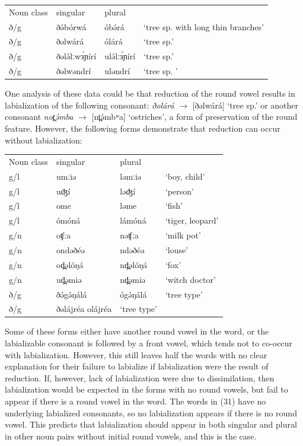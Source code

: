 \ea
\begin{tabular}[t]{llll}
Noun class	&	singular		&	plural\\
ð/g	&	ðə́bórwá		&	óbə́rá		&	‘tree sp. with long thin branches’\\
ð/g	&	ðəlwárá		&	ólárá	&	‘tree sp.’\\
ð/g	&	ðələ́lːwɜ́ɲírí	&	ulə́lːɜ́ɲírí	&	‘tree sp.’\\
ð/g	&	ðəlwəndrí	&	uləndrí	&	‘tree sp. ’\\
\end{tabular}
\z

One analysis of these data could be that reduction of the round vowel results in labialization of the following consonant: \textit{ðolárá} $\rightarrow$ [ðəlwárá] ‘tree sp.’ or another consonant \textit{not̪ə́mba} $\rightarrow$ [nt̪ə́mbʷa] ‘ostriches’, a form of preservation of the round feature. However, the following forms demonstrate that reduction can occur without labialization:

\ea
\begin{tabular}[t]{llll}
Noun class	&	singular		&	plural\\
g/l	&	umːiə	&	ləmːiə	 	&	‘boy, child’\\
g/l	&	uʤí		&	ləʤí		&	‘person’\\
g/l	&	ome		&	ləme			&	‘fish’\\
g/l	&	ómóná	&	lámóná		&	‘tiger, leopard’\\
g/n	&	oʧːa	&	nəʧːa		&	‘milk pot’\\
g/n	&	ondəðéə	&	ndəðéə		&	‘louse’\\
g/n	&	od̪əlóŋá	&	nd̪əlóŋá		&	‘fox’\\
g/n	&	ud̪əmiə	&	nd̪əmiə		&	‘witch doctor’\\
ð/g	&	ðə́gə́ŋálá	&	ógə́ŋálá		&	‘tree type’\\
ð/g	&	ðəlájréa	olájréa		&	‘tree type’\\
\end{tabular}
\z

Some of these forms either have another round vowel in the word, or the labializable consonant is followed by a front vowel, which tends not to co-occur with labialization. However, this still leaves half the words with no clear explanation for their failure to labialize if labialization were the result of reduction. If, however, lack of labialization were due to dissimilation, then labialization would be expected in the forms with no round vowels, but fail to appear if there is a round vowel in the word. The words in (31) have no underlying labialized consonants, so no labialization appears if there is no round vowel. This predicts that labialization should appear in both singular and plural in other noun pairs without initial round vowels, and this is the case. 

